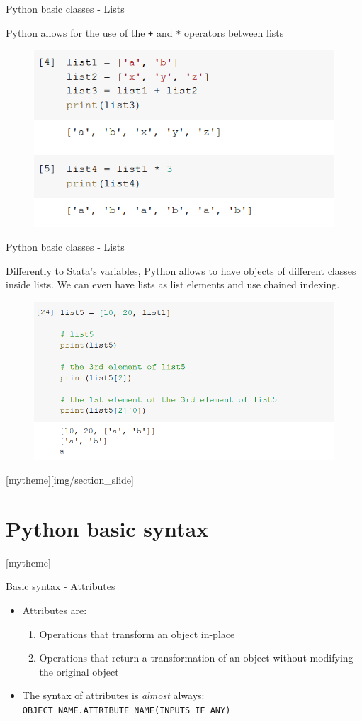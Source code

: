 \documentclass[aspectratio=169]{beamer}
\newcommand{\sectionpic}[2]{
	\setbeamertemplate{section page}[mytheme][#2]
	\section{#1}
	\setbeamertemplate{section page}[mytheme]
}
\begin{document}
\begin{frame}{Python basic classes - Lists}

	Python allows for the use of the \texttt{+} and \texttt{*} operators between lists

	\begin{figure}
		\centering
		\includegraphics[width=0.6\linewidth]{img/list_operations.png}
	\end{figure}

\end{frame}

\begin{frame}{Python basic classes - Lists}

	Differently to Stata's variables, Python allows to have objects of different classes inside lists. We can even have lists as list elements and use chained indexing.

	\begin{figure}
		\centering
		\includegraphics[width=0.6\linewidth]{img/list_many_types.png}
	\end{figure}

\end{frame}

\sectionpic{Python basic syntax}{img/section_slide}


\begin{frame}{Basic syntax - Attributes}

	\begin{itemize}
		\item Attributes are:
			\begin{enumerate}
				\item Operations that transform an object in-place
				\item Operations that return a transformation of an object without modifying the original object
			\end{enumerate}
		\item The syntax of attributes is \textit{almost} always: \texttt{OBJECT\_NAME.ATTRIBUTE\_NAME(INPUTS\_IF\_ANY)}
	\end{itemize}

\end{frame}
\end{document}
